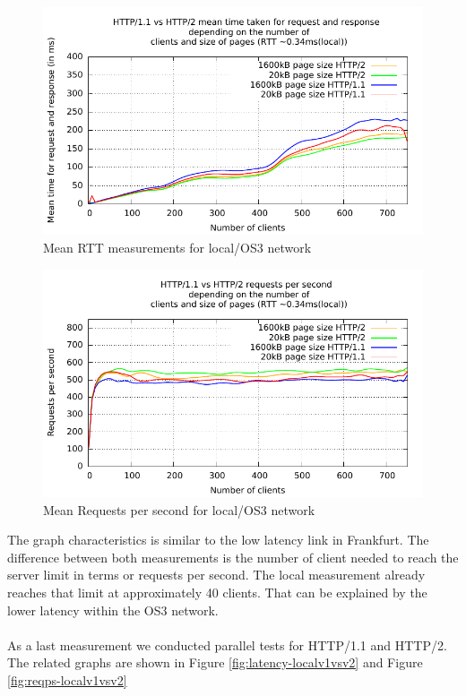 \begin{figure}[H]
	\centering
	\includegraphics[scale=1,trim=0.0cm .0cm .0cm .0cm,clip]{images/latency-local.pdf}
	\caption{Mean RTT measurements for local/OS3 network}
	\label{fig:latency-local}
\end{figure}

\begin{figure}[H]
	\centering
	\includegraphics[scale=1,trim=0.0cm .0cm .0cm .0cm,clip]{images/reqps-local.pdf}
	\caption{Mean Requests per second for local/OS3 network}
	\label{fig:reqps-local}
\end{figure}

The graph characteristics is similar to the low latency link in Frankfurt. The difference between both measurements is the number of client needed to reach the server limit in terms or requests per second. The local measurement already reaches that limit at approximately 40 clients. That can be explained by the lower latency within the OS3 network.
\\
\\
As a last measurement we conducted parallel tests for HTTP/1.1 and HTTP/2. The related graphs are shown in Figure \ref{fig:latency-localv1vsv2} and Figure \ref{fig:reqps-localv1vsv2}

